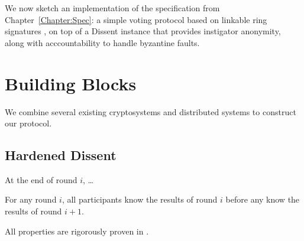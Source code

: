 We now sketch an implementation of the specification from
Chapter~\ref{Chapter:Spec}: a simple voting protocol based on linkable ring
signatures \cite{lrs}, on top of a Dissent instance that provides instigator
anonymity, along with acccountability to handle byzantine faults.
\section{Building Blocks}
We combine several existing cryptosystems and distributed systems to construct
our protocol.
\subsection{Hardened Dissent}
  \begin{theorem} At the end of round $i$, \ldots {}\end{theorem}
  \begin{theorem} For any round $i$, all participants know the results of round
    $i$ before any know the results of round
    $i+1$.\end{theorem}\label{theorem:rounds}
  All properties are rigorously proven in \cite{sec}.

